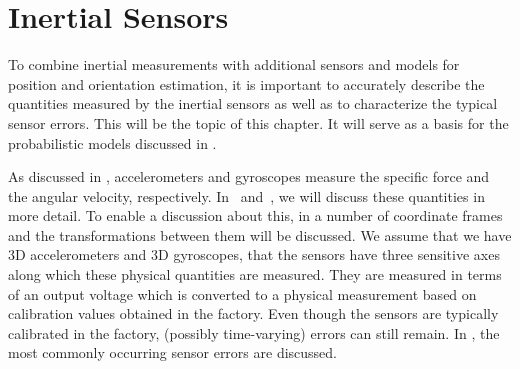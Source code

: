 \chapter{Inertial Sensors}
\label{cha:sensors} 
To combine inertial measurements with additional sensors and models for position and orientation estimation, it is important to accurately describe the quantities measured by the inertial sensors as well as to characterize the typical sensor errors. This will be the topic of this chapter. It will serve as a basis for the probabilistic models discussed in .

As discussed in , accelerometers and gyroscopes measure the specific force and the angular velocity, respectively. In~ and~, we will discuss these quantities in more detail. To enable a discussion about this, in  a number of coordinate frames and the transformations between them will be discussed. We assume that we have 3D accelerometers and 3D gyroscopes, \ie that the sensors have three sensitive axes along which these physical quantities are measured. They are measured in terms of an output voltage which is converted to a physical measurement based on calibration values obtained in the factory. Even though the sensors are typically calibrated in the factory, (possibly time-varying) errors can still remain. In , the most commonly occurring sensor errors are discussed. 

